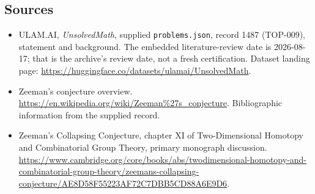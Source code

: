 \documentclass[11pt,a4paper]{article}
\begin{document}
\subsection{Sources}

{\small

\begin{itemize}

\item[\hypertarget{source:1487:1}{S1}] ULAM.AI, \emph{UnsolvedMath}, supplied \texttt{problems.json}, record 1487 (TOP-009), statement and background. The embedded literature-review date is 2026-08-17; that is the archive’s review date, not a fresh certification. Dataset landing page: \url{https://huggingface.co/datasets/ulamai/UnsolvedMath}.

\item[\hypertarget{source:1487:2}{S2}] Zeeman's conjecture overview. \url{https://en.wikipedia.org/wiki/Zeeman%27s_conjecture}. Bibliographic information from the supplied record.

\item[R1] Zeeman’s Collapsing Conjecture, chapter XI of Two-Dimensional Homotopy and Combinatorial Group Theory, primary monograph discussion.
\url{https://www.cambridge.org/core/books/abs/twodimensional-homotopy-and-combinatorial-group-theory/zeemans-collapsing-conjecture/AE8D58F55223AF72C7DBB5CD88A6E9D6}.
\end{itemize}

}

\label{end:1487}
\end{document}
